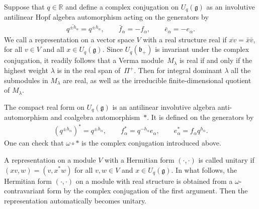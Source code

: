 \documentclass[pdftex]{sigma}
\numberwithin{equation}{section}
\begin{document}
Suppose that $q\in \mathbb{R}$ and define a complex conjugation on $U_q(\mathfrak{g})$ as an involutive antilinear Hopf algebra automorphism acting on the generators by
\begin{gather*}
\overline{q^{\pm h_\alpha}}=q^{\pm h_\alpha}, \qquad \bar f_\alpha =- f_\alpha, \qquad \bar e_\alpha= -e_\alpha.
\end{gather*}
We call a representation on a vector space $V$ with a real structure real if $\overline{x v}=\bar x \bar v$, for all $v\in V$ and all $x\in U_q(\mathfrak{g})$. Since $U_q(\mathfrak{b}_+)$ is invariant under the complex conjugation, it readily follows that a Verma module~$M_\lambda$ is real if and only if the highest weight $\lambda$ is in the real span of~$\Pi^+$. Then for integral dominant $\lambda$ all the submodules in $M_\lambda$ are real, as well as the irreducible finite-dimensional quotient of $M_\lambda$.

The compact real form on $U_q(\mathfrak{g})$ is an antilinear involutive algebra anti-automorphism and coalgebra automorphism~$*$. It is defined on the generators by
\begin{gather*}
(q^{\pm h_\alpha})^*=q^{\pm h_\alpha}, \qquad f_\alpha^*=q^{-h_\alpha} e_\alpha, \qquad e_\alpha^*= f_\alpha q^{h_\alpha}.
\end{gather*}
One can check that $\omega \circ *$ is the complex conjugation introduced above.

A representation on a module $V$ with a Hermitian form $( \cdot,\cdot )$ is called unitary if $(x v , w)=(v , x^* w )$ for all $v,w\in V$ and $x\in U_q(\mathfrak{g})$. In what follows, the Hermitian form $(\cdot ,\cdot )$ on a module with real structure is obtained from a $\omega$-contravariant form by the complex conjugation of the first argument. Then the representation automatically becomes unitary.
\end{document}
